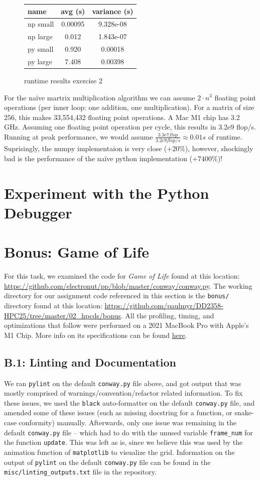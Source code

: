 \documentclass[a4paper,12pt]{article}
\begin{document}
\begin{figure}[H]
  \centering
  \begin{tabular}{l|c|c}
    name & avg (s) & variance (s)\\\hline
    np small & 0.00095 & 9.328e-08\\
    np large & 0.012 & 1.843e-07\\
    py small & 0.920 & 0.00018\\
    py large & 7.408 & 0.00398\\
  \end{tabular}
  \caption{runtime results exercise 2}\label{tab:ex2}
\end{figure}

For the naïve martrix multiplication algorithm we can assume $2 \cdot n^{3}$ floating point operations (per inner loop: one addition, one multiplication).
For a matrix of size 256, this makes 33,554,432 floating point operations.
A Mac M1 chip has 3.2 GHz.
Assuming one floating point operation per cycle, this results in 3.2e9 flop/s.
Running at peak performance, we would assume
$\frac{3.3e7 flop}{3.2e9flop/s} \approx 0.01s$ of runtime.
Suprisingly, the numpy implementaion is very close ($+20\%$), however, shockingly bad is the performance of the naïve python implementation ($+7400\%$)!

\section{Experiment with the Python Debugger}
\section{Bonus: Game of Life}
For this task, we examined the code for \textit{Game of Life} found at this location: \url{https://github.com/electronut/pp/blob/master/conway/conway.py}. The working directory for our assignment code referenced in this section is the \verb|bonus/| directory found at this location: \url{https://github.com/paulmyr/DD2358-HPC25/tree/master/02_hpcds/bonus}. All the profiling, timing, and optimizations that follow were performed on a 2021 MacBook Pro with Apple's M1 Chip. More info on its specifications can be found \href{https://support.apple.com/en-us/111901}{here}.
\subsection{B.1: Linting and Documentation}
We ran \verb|pylint| on the default \verb|conway.py| file above, and got output that was mostly comprised of warnings/convention/refactor related information. To fix these issues, we used the \verb|black| auto-formatter on the default \verb|conway.py| file, and amended some of these issues (such as missing docstring for a function, or snake-case conformity) manually. Afterwards, only one issue was remaining in the default \verb|conway.py| file -- which had to do with the unused variable \verb|frame_num| for the function \verb|update|. This was left as is, since we believe this was used by the animation function of \verb|matplotlib| to visualize the grid. Information on the output of \verb|pylint| on the default \verb|conway.py| file can be found in the \verb|misc/linting_outputs.txt| file in the repository. 
\end{document}
